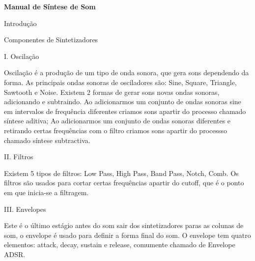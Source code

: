 \documentclass[12pt]{article}
\begin{document}
 

\begin{titlepage}
    \begin{center}
        \Huge\textbf{Manual de S\'intese de Som}
         
        \vspace{10cm}
    \end{center}
\end{titlepage}

\begin{center}
    \Huge{Introdu\c c\~ao}
\end{center}

\justifying

\pagebreak

\begin{center}
    \Huge{Componentes de Sintetizadores}
\end{center}

\begin{flushleft}
    \Large{I. Oscila\c c\~ao}
\end{flushleft}

\justifying
    Oscila\c c\~ao \'e a produ\c c\~ao de um tipo de onda sonora, que gera sons
    dependendo da forma. As principais ondas sonoras de osciladores s\~ao:
    Sine, Square, Triangle, Sawtooth e Noise. 
    Existem 2 formas de gerar sons novas ondas sonoras, adicionando e
    subtraindo. Ao adicionarmos um conjunto de ondas sonoras sine em intervalos
    de frequ\^encia diferentes criamos sons apartir do processo chamado
    s\'intese aditiva; Ao adicionarmos um conjunto de ondas sonoras diferentes e retirando certas frequ\^encias com o filtro criamos sons apartir do processso chamado s\'intese subtractiva. 


\begin{flushleft}
    \Large{II. Filtros}
\end{flushleft}
\justifying
Existem 5 tipos de filtros: Low Pass, High Pass, Band Pass, Notch, Comb. Os
filtros s\~ao usados para cortar certas frequ\^encias apartir do cutoff, que
\'e o ponto em que inicia-se a filtragem. 


\begin{flushleft}
    \Large{III. Envelopes}
\end{flushleft}
\justifying
Este \'e o \'ultimo est\'agio antes do som sair dos sintetizadores paras as
colunas de som, o envelope \'e usado para definir a forma final do som. 
O envelope tem quatro elementos: attack, decay, sustain e
release, comumente chamado de Envelope ADSR. 
\end{document}
